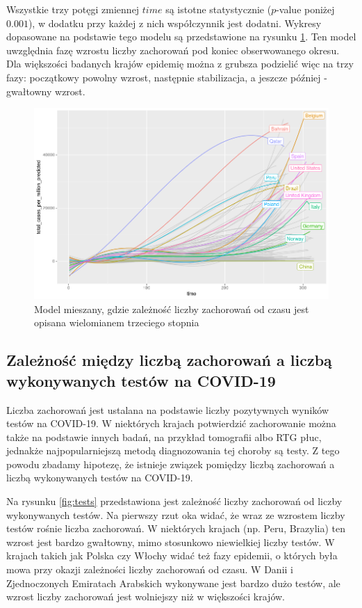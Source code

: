 \documentclass[12pt]{mwbk}
\theoremstyle{plain}
\theoremstyle{definition}
\theoremstyle{definition}
\begin{document}
Wszystkie trzy potęgi zmiennej $time$ są istotne statystycznie ($p$-value poniżej $0.001$), w dodatku przy każdej z nich współczynnik jest dodatni. Wykresy dopasowane na podstawie tego modelu są przedstawione na rysunku \ref{fig:mod1_poly_predict}. Ten model uwzględnia fazę wzrostu liczby zachorowań pod koniec obserwowanego okresu. Dla większości badanych krajów epidemię można z grubsza podzielić więc na trzy fazy: początkowy powolny wzrost, następnie stabilizacja, a jeszcze później - gwałtowny wzrost.

\begin{figure}[!h]
	\centering
	\includegraphics[width=\linewidth]{rys/mod1_poly_predict.png}
	
	\caption{Model mieszany, gdzie zależność liczby zachorowań od czasu jest opisana wielomianem trzeciego stopnia}
	\label{fig:mod1_poly_predict}
\end{figure}

\subsection{Zależność między liczbą zachorowań a liczbą wykonywanych testów na COVID-19}

Liczba zachorowań jest ustalana na podstawie liczby pozytywnych wyników testów na COVID-19. W niektórych krajach potwierdzić zachorowanie można także na podstawie innych badań, na przykład tomografii albo RTG płuc, jednakże najpopularniejszą metodą diagnozowania tej choroby są testy. Z tego powodu zbadamy hipotezę, że istnieje związek pomiędzy liczbą zachorowań a liczbą wykonywanych testów na COVID-19.

Na rysunku \ref{fig:tests} przedstawiona jest zależność liczby zachorowań od liczby wykonywanych testów. Na pierwszy rzut oka widać, że wraz ze wzrostem liczby testów rośnie liczba zachorowań. W niektórych krajach (np. Peru, Brazylia) ten wzrost jest bardzo gwałtowny, mimo stosunkowo niewielkiej liczby testów. W krajach takich jak Polska czy Włochy widać też fazy epidemii, o których była mowa przy okazji zależności liczby zachorowań od czasu. W Danii i Zjednoczonych Emiratach Arabskich wykonywane jest bardzo dużo testów, ale wzrost liczby zachorowań jest wolniejszy niż w większości krajów.
\end{document}
